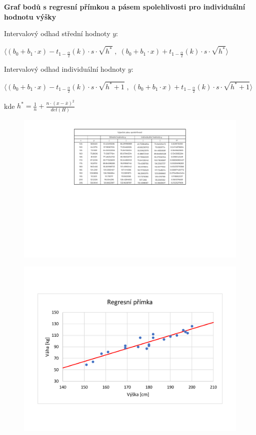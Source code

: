 \documentclass[11pt, a4paper, titlepage]{article}
\begin{document}
\textbf{Graf bodů s regresní přímkou a pásem spolehlivosti pro individuální hodnotu výšky}
\medskip

Intervalový odhad střední hodnoty $y$:
\medskip

\qquad ${\displaystyle \Big\langle (b_0 + b_1 \cdot x) - t_{1 - \frac{\alpha}{2}}(k) \cdot s \cdot \sqrt{h^*} \;,\; (b_0 + b_1 \cdot x) + t_{1 - \frac{\alpha}{2}}(k) \cdot s \cdot \sqrt{h^*} \Big\rangle}$
\medskip

Intervalový odhad individuální hodnoty $y$:
\medskip

\qquad ${\displaystyle \Big\langle (b_0 + b_1 \cdot x) - t_{1 - \frac{\alpha}{2}}(k) \cdot s \cdot \sqrt{h^* + 1} \;,\; (b_0 + b_1 \cdot x) + t_{1 - \frac{\alpha}{2}}(k) \cdot s \cdot \sqrt{h^* + 1} \Big\rangle}$
\medskip

kde \quad ${\displaystyle h^* = \frac{1}{n} + \frac{n \cdot (x - \overline{x})^2}{det(H)}}$
\newpage

\begin{figure}[H]
    \centering
    \includegraphics[width=.99\linewidth]{images/2-c-1-crop.pdf}
\end{figure}
\bigskip

\begin{figure}[H]
    \centering
    \includegraphics[width=.9\linewidth]{images/2-c-2-crop.pdf}
\end{figure}
\bigskip
\end{document}
